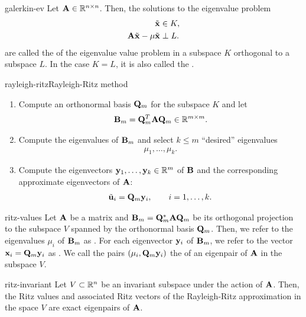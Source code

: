 \begin{Definition}{galerkin-ev}
  Let $\mathbf A\in\mathbb R^{n\times n}$. Then, the solutions to the eigenvalue problem
  \begin{align}
    \tilde{\mathbf x} &\in K,\\
    \mathbf A\tilde{\mathbf x} - \mu\tilde{\mathbf x}&\perp L.
  \end{align}
  are called the  of the eigenvalue value problem in a subspace $K$ orthogonal to a subspace
  $L$. In the case $K=L$, it is also called the .
\end{Definition}

\begin{Algorithm*}{rayleigh-ritz}{Rayleigh-Ritz method}
  \begin{enumerate}
  \item Compute an orthonormal basis $\mathbf Q_m$ for the subspace $K$ and let
    \begin{gather}
      \mathbf B_m = \mathbf Q_m^T\mathbf A\mathbf Q_m \in \mathbb R^{m\times m}.
    \end{gather}
  \item Compute the eigenvalues of $\mathbf B_m$ and select $k\le m$ ``desired'' eigenvalues
    \begin{gather}
      \mu_1, \dots,\mu_k.
    \end{gather}
  \item Compute the eigenvectors $\mathbf y_1,\dots,\mathbf y_k\in\mathbb R^m$ of $\mathbf B$
    and the corresponding approximate eigenvectors of $\mathbf A$:
    \begin{gather}
      \tilde{\mathbf u}_i = \mathbf Q_m \mathbf y_i,\qquad i=1,\dots,k.
    \end{gather}
  \end{enumerate}
\end{Algorithm*}

\begin{Definition}{ritz-values}
  Let $\mathbf A$ be a matrix and $\mathbf B_m = \mathbf Q_m^*\mathbf A\mathbf Q_m$ be its
  orthogonal projection to the subspace $V$ spanned by the orthonormal
  basis $\mathbf Q_m$. Then, we refer to the eigenvalues $\mu_i$ of
  $\mathbf B_m$ as .  For each eigenvector $\mathbf y_i$ of
  $\mathbf B_m$, we refer to the vector $\mathbf x_i = \mathbf Q_m\mathbf y_i$ as
  . We call the pairs $(\mu_i,\mathbf Q_m\mathbf y_i)$ the
   of an eigenpair of $\mathbf A$ in the
  subspace $V$.
\end{Definition}

\begin{Lemma}{ritz-invariant}
  Let $V\subset\mathbb R^n$ be an invariant subspace under the action of
  $\mathbf A$. Then, the Ritz values and associated Ritz vectors of the
  Rayleigh-Ritz approximation in the space $V$ are exact eigenpairs of $\mathbf A$.
\end{Lemma}

